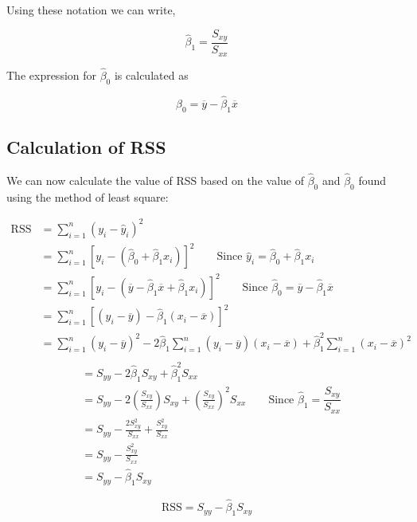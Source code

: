 \documentclass[twoside]{book}
\begin{document}
Using these notation we can write,
\begin{textbox}
$$\hat{\beta}_1 = \dfrac{S_{xy}}{S_{xx}}$$
\end{textbox}
The expression for $\hat{\beta}_0$ is calculated as
\begin{textbox}
\[
\hat{\beta}_0 = \overline{y} - \hat{\beta}_1 \overline{x}
\]
\end{textbox}

\subsection{Calculation of RSS}
We can now calculate the value of RSS based on the value of $\hat{\beta}_0$ and $\hat{\beta}_0$ found using the method of least square:

\begin{align*}
\text{RSS} &= \sum_{i=1}^{n} (y_i - \hat{y}_i)^2 \\
&= \sum_{i=1}^{n} \left[ y_i - (\hat{\beta}_0 + \hat{\beta}_1x_i) \right]^2 \qquad \text{Since }\hat{y}_i = \hat{\beta}_0 + \hat{\beta}_1x_i\\
&= \sum_{i=1}^{n} \left[ y_i - (\overline{y} - \hat{\beta}_1 \overline{x} + \hat{\beta}_1x_i) \right]^2 \qquad \text{Since }\hat{\beta}_0 = \overline{y} - \hat{\beta}_1 \overline{x}\\
&= \sum_{i=1}^{n} \left[ (y_i - \overline{y}) - \hat{\beta}_1 (x_i - \overline{x}) \right]^2 \\
&= \sum_{i=1}^{n} (y_i - \overline{y})^2 - 2\hat{\beta}_1 \sum_{i=1}^{n} (y_i - \overline{y})(x_i - \overline{x}) + \hat{\beta}_1^2 \sum_{i=1}^{n} (x_i - \overline{x})^2 \\
\end{align*}
\begin{align*}
&= S_{yy} - 2\hat{\beta}_1 S_{xy} + \hat{\beta}_1^2 S_{xx}\\
&= S_{yy} - 2\left( \frac{S_{xy}}{S_{xx}} \right) S_{xy} + \left( \frac{S_{xy}}{S_{xx}} \right)^2 S_{xx} \qquad \text{Since }\hat{\beta}_1 = \dfrac{S_{xy}}{S_{xx}} \\
&= S_{yy} - \frac{2 S_{xy}^2}{S_{xx}} + \frac{S_{xy}^2}{S_{xx}} \\
&= S_{yy} - \frac{S_{xy}^2}{S_{xx}} \\
&= S_{yy} - \hat{\beta}_1 S_{xy}
\end{align*}

\begin{textbox}
    $$\text{RSS} = S_{yy} - \hat{\beta}_1 S_{xy}$$
\end{textbox}
\end{document}
